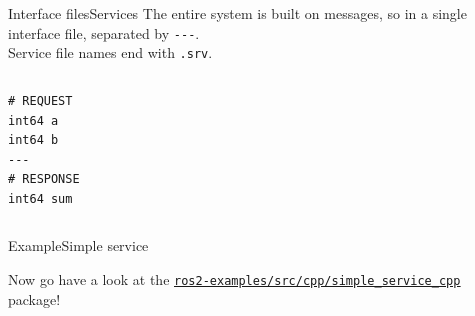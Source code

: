 \begin{frame}[fragile]{Interface files}{Services}
  \justifying
  The entire system is built on messages, so  in a single interface file, separated by \texttt{-{}-{}-}.\\
  Service file names end with \texttt{.srv}.
  \begin{columns}
    \begin{lstlisting}[language=ros2msg, caption=Definition of the \texttt{example\_interfaces/srv/AddTwoInts} service.]
# REQUEST
int64 a
int64 b
---
# RESPONSE
int64 sum
    \end{lstlisting}
  \end{columns}
\end{frame}

\begin{frame}{Example}{Simple service}
  \begin{block}{}
    \centering
    Now go have a look at the \href{https://github.com/IntelligentSystemsLabUTV/ros2-examples/tree/jazzy/src/cpp/simple_service_cpp}{\color{blue}\underline{\texttt{ros2-examples/src/cpp/simple\_service\_cpp}}} package!
  \end{block}
\end{frame}
